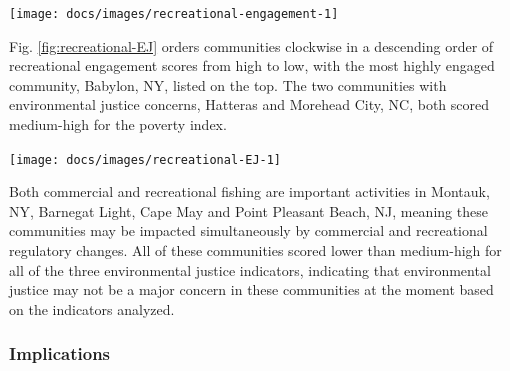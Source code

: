 \documentclass[
  10pt,
]{article}
\let\origfigure\figure
\let\endorigfigure\endfigure
\renewenvironment{figure}[1][2] {
    \expandafter\origfigure\expandafter[H]
} {
    \endorigfigure
}
\begin{document}
\begin{figure}

{\centering \texttt{[image: docs/images/recreational-engagement-1]} 

}

\caption{Recreational engagement and reliance, and environmental justice vulnerability, for the top recreationally engaged and reliant fishing communities in the Mid-Atlantic. Communities ranked medium-high or above for one or more of the environmental justice indicators are highlighted in bright orange. *Community scored high (1.00 and above) for both recreational engagement and reliance indicators.}\label{fig:recreational-engagement}
\end{figure}

Fig. \ref{fig:recreational-EJ} orders communities clockwise in a
descending order of recreational engagement scores from high to low,
with the most highly engaged community, Babylon, NY, listed on the top.
The two communities with environmental justice concerns, Hatteras and
Morehead City, NC, both scored medium-high for the poverty index.

\begin{figure}

{\centering \texttt{[image: docs/images/recreational-EJ-1]} 

}

\caption{Environmental justice indicators (Poverty Index, population composition index, and personal disruption index) for top recreational fishing communities in Mid-Atlantic. *Community scored high (1.00 and above) for both recreational engagement and reliance indicators.}\label{fig:recreational-EJ}
\end{figure}

Both commercial and recreational fishing are important activities in
Montauk, NY, Barnegat Light, Cape May and Point Pleasant Beach, NJ,
meaning these communities may be impacted simultaneously by commercial
and recreational regulatory changes. All of these communities scored
lower than medium-high for all of the three environmental justice
indicators, indicating that environmental justice may not be a major
concern in these communities at the moment based on the indicators
analyzed.

\hypertarget{implications-4}{%
\subsubsection{Implications}\label{implications-4}}
\end{document}
